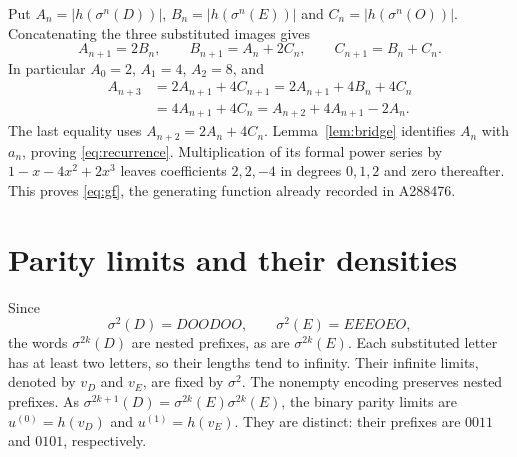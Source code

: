 \documentclass[11pt]{article}
\begin{document}
Put $A_n=|h(\sigma^n(D))|$, $B_n=|h(\sigma^n(E))|$ and
$C_n=|h(\sigma^n(O))|$. Concatenating the three substituted images gives
\begin{equation}\label{eq:states}
A_{n+1}=2B_n,\qquad B_{n+1}=A_n+2C_n,\qquad C_{n+1}=B_n+C_n.
\end{equation}
In particular $A_0=2$, $A_1=4$, $A_2=8$, and
\[
\begin{aligned}
A_{n+3}&=2A_{n+1}+4C_{n+1}
       =2A_{n+1}+4B_n+4C_n\\
       &=4A_{n+1}+4C_n
        =A_{n+2}+4A_{n+1}-2A_n.
\end{aligned}
\]
The last equality uses $A_{n+2}=2A_n+4C_n$.
Lemma~\ref{lem:bridge} identifies $A_n$ with $a_n$, proving
\eqref{eq:recurrence}. Multiplication of its formal power series by
$1-x-4x^2+2x^3$ leaves coefficients $2,2,-4$ in degrees $0,1,2$
and zero thereafter. This proves \eqref{eq:gf}, the generating function
already recorded in A288476.

\section{Parity limits and their densities}
Since
\[
\sigma^2(D)=DOODOO,\qquad \sigma^2(E)=EEEOEO,
\]
the words $\sigma^{2k}(D)$ are nested prefixes, as are
$\sigma^{2k}(E)$. Each substituted letter has at least two letters,
so their lengths tend to infinity. Their infinite limits, denoted by
$v_D$ and $v_E$, are fixed by $\sigma^2$.
The nonempty encoding preserves nested prefixes. As
$\sigma^{2k+1}(D)=\sigma^{2k}(E)\sigma^{2k}(E)$,
the binary parity limits are
$u^{(0)}=h(v_D)$ and $u^{(1)}=h(v_E)$. They are distinct:
their prefixes are $0011$ and $0101$, respectively.
\end{document}
